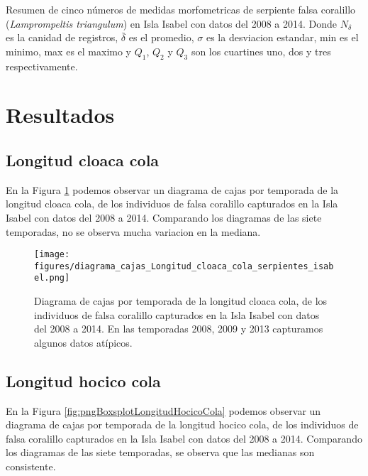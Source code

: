 \documentclass{article}
\begin{document}
\begin{table}[H]
\centering
\caption{Resumen de cinco números de medidas morfometricas de serpiente falsa coralillo
(\textit{Lamprompeltis triangulum}) en Isla Isabel  con datos del 2008 a 2014. Donde $N_{\delta}$ es
la canidad de registros, $\bar{\delta}$ es el promedio, $\sigma$ es la desviacion estandar, min es
el minimo, max es el maximo y $Q_1$, $Q_2$ y $Q_3$ son los cuartines uno, dos y tres
respectivamente.}
\vspace{0.5cm}
\pgfplotstabletypeset[string type, assign column name/.style={/pgfplots/table/column
name={\textbf{#1}}}, every head row/.style={before row={\toprule}, after row=\midrule}, every last
row/.style={after row=\bottomrule},]{\ResumenCincoNumeros}
   \label{tab:ResumenCincoNumeros}
 \end{table}

\section*{Resultados}

\subsection*{Longitud cloaca cola}
En la Figura \ref{fig:pngBoxsplotLongitudCloacaCola} podemos observar un diagrama de cajas por
temporada de la longitud cloaca cola, de los individuos de falsa coralillo capturados en la Isla
Isabel con datos del 2008 a 2014. Comparando los diagramas de las siete temporadas, no se observa
mucha variacion en la mediana.

\begin{figure}[H]
\centering
\label{fig:pngBoxsplotLongitudCloacaCola}
\texttt{[image: figures/diagrama\_cajas\_Longitud\_cloaca\_cola\_serpientes\_isabel.png]}
\caption{Diagrama de cajas por temporada de la longitud cloaca cola, de los individuos de falsa coralillo capturados en la Isla Isabel con datos del 2008 a 2014. En las temporadas 2008, 2009 y 2013 capturamos algunos datos atípicos.}
\end{figure}

\subsection*{Longitud hocico cola}
En la Figura \ref{fig:pngBoxsplotLongitudHocicoCola} podemos observar un diagrama de cajas por
temporada de la longitud hocico cola, de los individuos de falsa coralillo capturados en la Isla
Isabel con datos del 2008 a 2014. Comparando los diagramas de las siete temporadas, se observa  que
las medianas son consistente.
\end{document}
